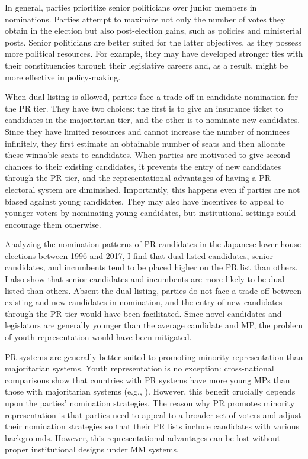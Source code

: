 \documentclass[a4paper, 11pt]{article}
\begin{document}
In general, parties prioritize senior politicians over junior members in nominations. Parties attempt to maximize not only the number of votes they obtain in the election but also post-election gains, such as policies and ministerial posts. Senior politicians are better suited for the latter objectives, as they possess more political resources. For example, they may have developed stronger ties with their constituencies through their legislative careers and, as a result, might be more effective in policy-making. 

When dual listing is allowed, parties face a trade-off in candidate nomination for the PR tier. They have two choices: the first is to give an insurance ticket to candidates in the majoritarian tier, and the other is to nominate new candidates. Since they have limited resources and cannot increase the number of nominees infinitely, they first estimate an obtainable number of seats and then allocate these winnable seats to candidates. When parties are motivated to give second chances to their existing candidates, it prevents the entry of new candidates through the PR tier, and the representational advantages of having a PR electoral system are diminished. Importantly, this happens even if parties are not biased against young candidates. They may also have incentives to appeal to younger voters by nominating young candidates, but institutional settings could encourage them otherwise. 

Analyzing the nomination patterns of PR candidates in the Japanese lower house elections between 1996 and 2017, I find that dual-listed candidates, senior candidates, and incumbents tend to be placed higher on the PR list than others. I also show that senior candidates and incumbents are more likely to be dual-listed than others. Absent the dual listing, parties do not face a trade-off between existing and new candidates in nomination, and the entry of new candidates through the PR tier would have been facilitated. Since novel candidates and legislators are generally younger than the average candidate and MP, the problem of youth representation would have been mitigated. 

PR systems are generally better suited to promoting minority representation than majoritarian systems. Youth representation is no exception: cross-national comparisons show that countries with PR systems have more young MPs than those with majoritarian systems (e.g., \citet{joshi2013representation}). However, this benefit crucially depends upon the parties' nomination strategies. The reason why PR promotes minority representation is that parties need to appeal to a broader set of voters and adjust their nomination strategies so that their PR lists include candidates with various backgrounds. However, this representational advantages can be lost without proper institutional designs under MM systems. 
\end{document}
